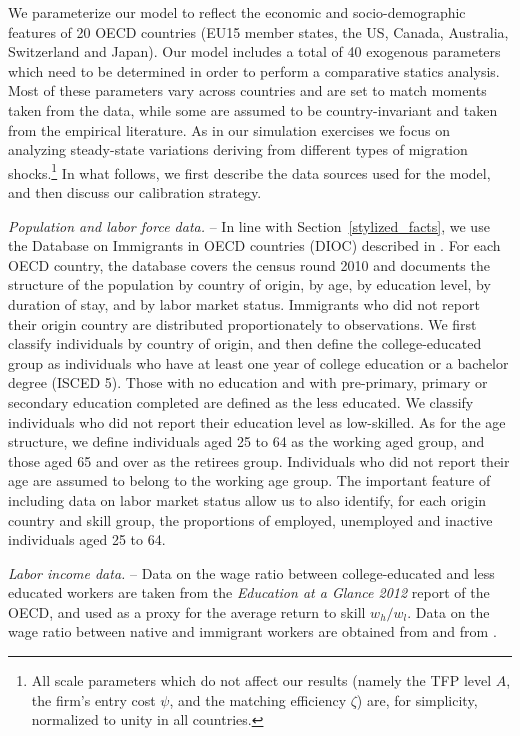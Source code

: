 \documentclass[a4paper,12pt]{article}
\begin{document}
We parameterize our model to reflect the economic and socio-demographic features of 20 OECD countries (EU15 member states, the US, Canada, Australia, Switzerland and Japan). 
Our model includes a total of 40 exogenous parameters which need to be determined in order to perform a comparative statics analysis. Most of these parameters vary across countries and are set to match moments taken from the data, while some are assumed to be country-invariant and taken from the empirical literature. As in our simulation exercises we focus on analyzing steady-state variations deriving from different types of migration shocks.\footnote{All scale parameters which do not affect our results (namely the TFP level $A$, the firm's entry cost  $\psi$, and the matching efficiency $\zeta$) are, for simplicity, normalized to unity in all countries.} In what follows, we first describe the data sources used for the model, and then discuss our calibration strategy.

\emph{Population and labor force data.} -- In  line  with  Section~\ref{stylized_facts},  we  use  the  Database  on  Immigrants in OECD countries (DIOC) described in \citet{Arslan2014}. For each OECD country, the database covers the census round 2010 and documents the structure of the population by country of origin, by age, by education level, by duration of stay, and by labor market status.  Immigrants who did not report their origin country are distributed proportionately to observations. We first classify individuals by country of origin, and then define the college-educated group as individuals who have at least one year of college education or a bachelor degree (ISCED 5).  Those with no education and with pre-primary, primary or secondary education completed are defined as the less educated. We classify individuals who did not report their education level
as low-skilled.  As for the age structure, we define individuals aged 25 to 64 as the working
aged group, and  those aged 65 and over as the retirees group. Individuals who did not report their age are assumed to belong to the working age group. The important feature of including data on labor market status allow us to also identify, for each origin country and skill group, the proportions of employed, unemployed and inactive individuals aged 25 to 64.

\emph{Labor income data.} -- Data on the wage ratio between college-educated and less educated workers are taken from the \textit{Education at a Glance 2012} report of the OECD, and used  as a proxy for the average return to skill $w_h/w_l$. Data on the wage ratio between native and immigrant workers are obtained from \citet{Buchel2005} and from \citet{Docquier2014}.
\end{document}
